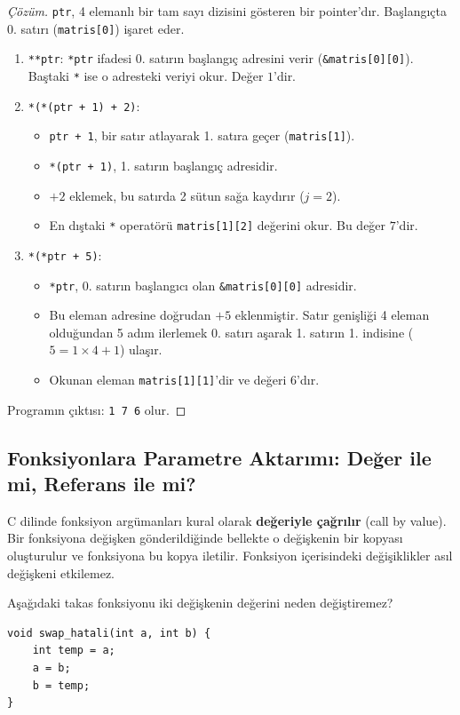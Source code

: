 \begin{proof}[Çözüm]
\texttt{ptr}, 4 elemanlı bir tam sayı dizisini gösteren bir pointer'dır. Başlangıçta 0. satırı (\texttt{matris[0]}) işaret eder.
\begin{enumerate}
    \item \texttt{**ptr}: \texttt{*ptr} ifadesi 0. satırın başlangıç adresini verir (\texttt{\&matris[0][0]}). Baştaki \texttt{*} ise o adresteki veriyi okur. Değer $1$'dir.
    \item \texttt{*(*(ptr + 1) + 2)}: 
    \begin{itemize}
        \item \texttt{ptr + 1}, bir satır atlayarak 1. satıra geçer (\texttt{matris[1]}).
        \item \texttt{*(ptr + 1)}, 1. satırın başlangıç adresidir.
        \item $+ 2$ eklemek, bu satırda 2 sütun sağa kaydırır ($j = 2$).
        \item En dıştaki \texttt{*} operatörü \texttt{matris[1][2]} değerini okur. Bu değer $7$'dir.
    \end{itemize}
    \item \texttt{*(*ptr + 5)}:
    \begin{itemize}
        \item \texttt{*ptr}, 0. satırın başlangıcı olan \texttt{\&matris[0][0]} adresidir.
        \item Bu eleman adresine doğrudan $+ 5$ eklenmiştir. Satır genişliği 4 eleman olduğundan 5 adım ilerlemek 0. satırı aşarak 1. satırın 1. indisine ($5 = 1 \times 4 + 1$) ulaşır.
        \item Okunan eleman \texttt{matris[1][1]}'dir ve değeri $6$'dır.
    \end{itemize}
\end{enumerate}
Programın çıktısı: \texttt{1 7 6} olur.
\end{proof}

\subsection{Fonksiyonlara Parametre Aktarımı: Değer ile mi, Referans ile mi?}

C dilinde fonksiyon argümanları kural olarak \textbf{değeriyle çağrılır} (call by value). Bir fonksiyona değişken gönderildiğinde bellekte o değişkenin bir kopyası oluşturulur ve fonksiyona bu kopya iletilir. Fonksiyon içerisindeki değişiklikler asıl değişkeni etkilemez.

\begin{example}
Aşağıdaki takas fonksiyonu iki değişkenin değerini neden değiştiremez?
\begin{lstlisting}[language=CTemel]
void swap_hatali(int a, int b) {
    int temp = a;
    a = b;
    b = temp;
}
\end{lstlisting}
\end{example}

